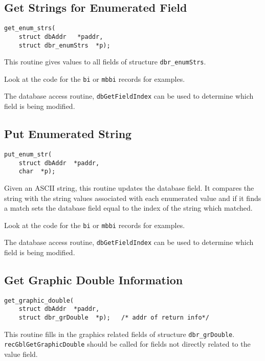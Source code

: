 \subsection{Get Strings for Enumerated Field}

\begin{verbatim}
get_enum_strs(
    struct dbAddr   *paddr,
    struct dbr_enumStrs  *p);
\end{verbatim}

This routine gives values to all fields of structure \verb|dbr_enumStrs|.

Look at the code for the \verb|bi| or \verb|mbbi| records for examples.

The database access routine, \verb|dbGetFieldIndex| can be used to determine which field is being modified.

\subsection{Put Enumerated String}

\begin{verbatim}
put_enum_str(
    struct dbAddr  *paddr,
    char  *p);
\end{verbatim}

Given an ASCII string, this routine updates the database field.
It compares the string with the string values associated with each enumerated value and if it finds a match sets the database field equal to the index of the string which matched.

Look at the code for the \verb|bi| or \verb|mbbi| records for examples.

The database access routine, \verb|dbGetFieldIndex| can be used to determine which field is being modified.

\subsection{Get Graphic Double Information}

\begin{verbatim}
get_graphic_double(
    struct dbAddr  *paddr,
    struct dbr_grDouble  *p);   /* addr of return info*/
\end{verbatim}

This routine fills in the graphics related fields of structure \verb|dbr_grDouble|.
\verb|recGblGetGraphicDouble| should be called for fields not directly related to the value field.

